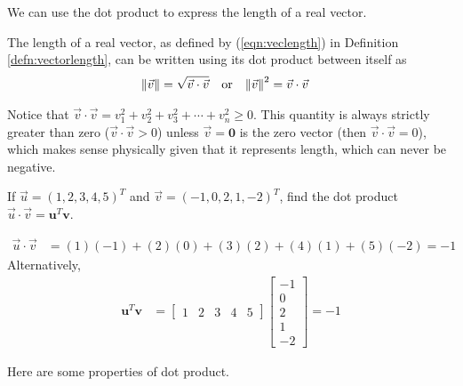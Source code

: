 We can use the dot product to express the length of a real vector.
\begin{proper}
\label{proper:lengthdot}
The length of a real vector, as defined by (\ref{eqn:veclength}) in Definition \ref{defn:vectorlength}, can be written using its dot product between itself as
\begin{align*}
\norm{\vec{v}} &= \sqrt{\vec{v} \cdot \vec{v}} & &\text{or} &
\norm{\vec{v}}^2 &= \vec{v} \cdot \vec{v}
\end{align*}
\end{proper}
Notice that $\vec{v} \cdot \vec{v} = v_1^2 + v_2^2 + v_3^2 + \cdots + v_n^2 \geq 0$. This quantity is always strictly greater than zero ($\vec{v} \cdot \vec{v} > 0$) unless $\vec{v} = \textbf{0}$ is the zero vector (then $\vec{v} \cdot \vec{v} = 0$), which makes sense physically given that it represents length, which can never be negative.
\begin{exmp}
\label{exmp:dotproduct5d}
If $\vec{u} = (1, 2, 3, 4, 5)^T$ and $\vec{v} = (-1, 0, 2, 1, -2)^T$, find the dot product $\vec{u} \cdot \vec{v} = \textbf{u}^T\textbf{v}$.
\end{exmp}
\begin{solution}
\begin{align*}
\vec{u} \cdot \vec{v} &= (1)(-1) + (2)(0) + (3)(2) + (4)(1) + (5)(-2) = -1
\end{align*}
Alternatively,
\begin{align*}
\textbf{u}^T\textbf{v} &=
\begin{bmatrix}
1 & 2 & 3 & 4 & 5
\end{bmatrix}
\begin{bmatrix}
-1 \\
0 \\
2 \\
1 \\
-2
\end{bmatrix}
= -1
\end{align*}
\end{solution}
Here are some properties of dot product.
